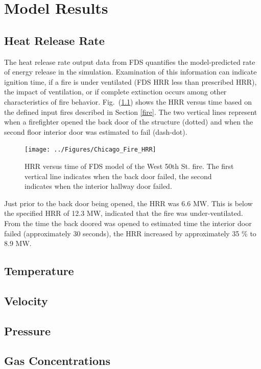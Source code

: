 \documentclass[11pt,oneside]{book}
\begin{document}
\chapter{Model Results}

\section{Heat Release Rate}
\label{HRR}
The heat release rate output data from FDS quantifies the model-predicted rate of energy release in the simulation. Examination of this information can indicate ignition time, if a fire is under ventilated (FDS HRR less than prescribed HRR), the impact of ventilation, or if complete extinction occurs among other characteristics of fire behavior. Fig.~(\ref{fig:hrr}) shows the HRR versus time based on the defined input fires described in Section \ref{fire}. The two vertical lines represent when a firefighter opened the back door of the structure (dotted) and when the second floor interior door was estimated to fail (dash-dot).

\begin{figure}[h!]
\centering
\texttt{[image: ../Figures/Chicago\_Fire\_HRR]}
\caption{HRR versus time of FDS model of the West 50th St. fire. The first vertical line indicates when the back door failed, the second indicates when the interior hallway door failed.}
\label{fig:hrr}
\end{figure}

Just prior to the back door being opened, the HRR was 6.6 MW. This is below the specified HRR of 12.3 MW, indicated that the fire was under-ventilated. From the time the back doored was opened to estimated time the interior door failed (approximately 30 seconds), the HRR increased by approximately 35 \% to 8.9 MW.



\section{Temperature}

\section{Velocity}

\section{Pressure}

\section{Gas Concentrations}
\end{document}

